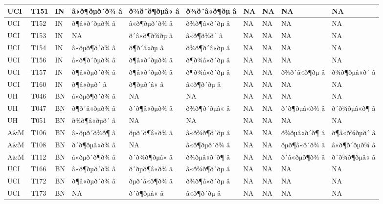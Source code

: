 \documentclass[]{article}
\begin{document}
\begin{table}[H]
\begin{tabular}{l|l|l|l|l|l|l|l|l|l}
\hline
UCI & T151 & IN & â«ð¶ðµð´ð¾ â & ð¾ð´ð¶ðµâ« â & ð¾ð´â«ð¶ðµ â & NA & NA & NA & NA\\
\hline
UCI & T152 & IN & ð¶â«ð´ðµð¾ â & â«ð¶ðµð´ð¾ â & ð¾ð¶â«ð´ðµ â & NA & NA & NA & NA\\
\hline
UCI & T153 & IN & NA & ð´â«ð¶ð¾ðµ â & â«ð¶ð¾ð´ â & NA & NA & NA & NA\\
\hline
UCI & T154 & IN & â«ðµð¶ð´ð¾ â & ð¶ð´â«ðµ â & ð¾ð¶ð´â«ðµ â & NA & NA & NA & NA\\
\hline
UCI & T156 & IN & â«ð¶ð´ðµð¾ â & ð¶â«ð´ðµð¾ â & ð¶ð¾â«ð´ðµ â & NA & NA & NA & NA\\
\hline
UCI & T157 & IN & ð¶â«ðµð´ð¾ â & ð¶â«ð´ðµð¾ â & ð¶ð¾â«ð´ðµ â & NA & NA & ð¾ð´â«ð¶ðµ â & ð¾ð¶ðµâ«ð´ â\\
\hline
UCI & T160 & IN & ð¶â«ðµð´ â & ð¶ðµð´â« â & â«ð¶ð´ðµ â & NA & NA & NA & NA\\
\hline
UH & T046 & BN & â«ðµð¶ð´ð¾ â & NA & NA & NA & NA & NA & NA\\
\hline
UH & T047 & BN & ð¶ð´â«ðµð¾ â & ð´ð¶â«ðµð¾ â & ð¾ð¶ð´ðµâ« â & NA & NA & ð´ð¶ðµâ«ð¾ â & ð´ð¾ðµâ«ð¶ â\\
\hline
UH & T051 & BN & ð¾ð¶â«ðµð´ â & NA & NA & NA & NA & NA & NA\\
\hline
A\&M & T106 & BN & â«ðµð´ð¾ð¶ â & ðµð´ð¶â«ð¾ â & â«ð¾ð¶ð´ðµ â & NA & NA & ð¾ðµâ«ð´ð¶ â & ð¶â«ð¾ðµð´ â\\
\hline
A\&M & T108 & BN & ð´ð¶ðµâ«ð¾ â & NA & â«ð¶ðµð´ð¾ â & NA & NA & ðµð¶â«ð´ð¾ â & â«ð¶ð´ðµð¾ â\\
\hline
A\&M & T112 & BN & â«ðµð´ð¶ð¾ â & ð´ð¾ð¶ðµâ« â & ð¾ðµâ«ð´ð¶ â & NA & NA & ð´â«ðµð¶ð¾ â & ð´ð¾ð¶ðµâ« â\\
\hline
UCI & T166 & BN & â«ð¶ðµð´ð¾ â & ð´ðµð¶â«ð¾ â & â«ð¾ð¶ð´ðµ â & NA & NA & NA & NA\\
\hline
UCI & T172 & BN & ð¶â«ðµð´ð¾ â & ðµð´â«ð¶ð¾ â & ð¾ð¶â«ð´ðµ â & NA & NA & NA & NA\\
\hline
UCI & T173 & BN & NA & ð´ð¶ðµâ« â & â«ð¶ð´ðµ â & NA & NA & NA & NA\\

\end{tabular}
\end{table}
\end{document}
